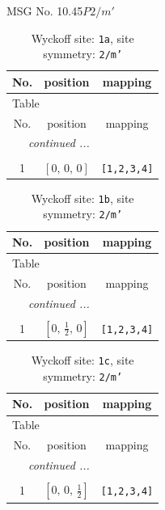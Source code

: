 \documentclass[fleqn,8pt]{jsarticle}
\begin{document}
\setcounter{MaxMatrixCols}{32}

\renewcommand{\tablename}{Table~}
\renewcommand{\figurename}{Figure~}
\begin{center}
\LARGE
MSG No. 10.45\quad$P2/m'$
\end{center}
\renewcommand{\arraystretch}{1.2}
\begin{longtable}{ccc}
\caption{Wyckoff site: {\tt 1a}, site symmetry: {\tt 2/m'}}
 \\
 \hline \hline
No. & position & mapping \\ \hline \endfirsthead

\multicolumn{2}{l}{\tablename\ \thetable{}} \\
 \hline \hline
No. & position & mapping \\ \hline \endhead

 \hline \hline
\multicolumn{2}{r}{\footnotesize\it continued ...} \\ \endfoot

 \hline \hline
\multicolumn{2}{r}{} \\ \endlastfoot

1 & $\left[ 0,\, 0,\, 0 \right]$ & {\tt [1,2,3,4]} \\
\end{longtable}
\renewcommand{\arraystretch}{1.2}
\begin{longtable}{ccc}
\caption{Wyckoff site: {\tt 1b}, site symmetry: {\tt 2/m'}}
 \\
 \hline \hline
No. & position & mapping \\ \hline \endfirsthead

\multicolumn{2}{l}{\tablename\ \thetable{}} \\
 \hline \hline
No. & position & mapping \\ \hline \endhead

 \hline \hline
\multicolumn{2}{r}{\footnotesize\it continued ...} \\ \endfoot

 \hline \hline
\multicolumn{2}{r}{} \\ \endlastfoot

1 & $\left[ 0,\, \frac{1}{2},\, 0 \right]$ & {\tt [1,2,3,4]} \\
\end{longtable}
\renewcommand{\arraystretch}{1.2}
\begin{longtable}{ccc}
\caption{Wyckoff site: {\tt 1c}, site symmetry: {\tt 2/m'}}
 \\
 \hline \hline
No. & position & mapping \\ \hline \endfirsthead

\multicolumn{2}{l}{\tablename\ \thetable{}} \\
 \hline \hline
No. & position & mapping \\ \hline \endhead

 \hline \hline
\multicolumn{2}{r}{\footnotesize\it continued ...} \\ \endfoot

 \hline \hline
\multicolumn{2}{r}{} \\ \endlastfoot

1 & $\left[ 0,\, 0,\, \frac{1}{2} \right]$ & {\tt [1,2,3,4]} \\
\end{longtable}
\end{document}
